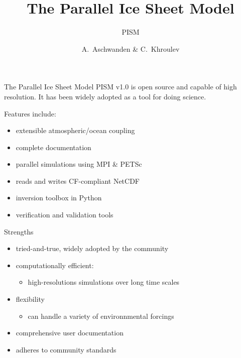 \documentclass[hide notes,intlimits]{beamer}
\title[PISM] %
{The Parallel Ice Sheet Model}
\subtitle{PISM}
\author[Aschwanden, Khroulev] %
{A.~Aschwanden \& C.~Khroulev}
\date{}
\begin{document}
  {
} 

\begin{frame}
  \titlepage
\end{frame}

  {
} 


\begin{frame}
  The Parallel Ice Sheet Model PISM v1.0 is open source and capable of high resolution. It has been widely adopted as a tool for doing science.
  
  Features include:

  \begin{itemize}
  \item extensible atmospheric/ocean coupling
  \item complete documentation
  \item parallel simulations using MPI \& PETSc
  \item reads and writes CF-compliant NetCDF
  \item inversion toolbox in Python
  \item verification and validation tools
  \end{itemize}
  
\end{frame}


\begin{frame}{Strengths}
  \begin{itemize}
  \item tried-and-true, widely adopted by the community
    \item computationally efficient:
      \begin{itemize}
      \item high-resolutions simulations over long time scales
      \end{itemize}
    \item flexibility
      \begin{itemize}
      \item can handle a variety of environnmental forcings
      \end{itemize}
      \item comprehensive user documentation
      \item adheres to community standards 
    \end{itemize}
\end{frame}
\end{document}
